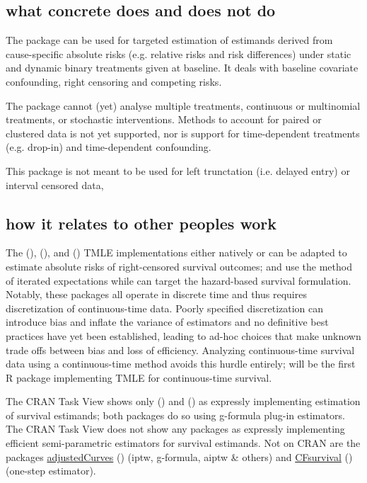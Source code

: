 \documentclass{report}
\newcommand{\1}{\ensuremath{\mathbf{1}}}
\begin{document}
\subsection{what concrete does and does not do}
\label{sec:org1a69176}
The package can be used for targeted estimation of estimands derived from cause-specific absolute risks (e.g. relative risks and risk differences) under static and dynamic binary treatments given at baseline. It deals with baseline covariate confounding, right censoring and competing risks.

The package cannot (yet) analyse multiple treatments, continuous or multinomial treatments, or stochastic interventions. Methods to account for paired or clustered data is not yet supported, nor is support for time-dependent treatments (e.g. drop-in) and time-dependent confounding.

This package is not meant to be used for left trunctation (i.e. delayed entry) or interval censored data, 

\subsection{how it relates to other peoples work}
\label{sec:org7594453}

The  (\cite{schwab_ltmle_2020}),  (\cite{sofrygin_stremr_2017}), and  (\cite{benkeser_survtmle_2019}) TMLE implementations either natively or can be adapted to estimate absolute risks of right-censored survival outcomes;  and  use the method of iterated expectations while  can target the hazard-based survival formulation. Notably, these packages all operate in discrete time and thus requires discretization of continuous-time data. Poorly specified discretization can introduce bias and inflate the variance of estimators and no definitive best practices have yet been established, leading to ad-hoc choices that make unknown trade offs between bias and loss of efficiency. Analyzing continuous-time survival data using a continuous-time method avoids this hurdle entirely;  will be the first R package implementing TMLE for continuous-time survival.

The  CRAN Task View shows only  (\cite{gerds_riskregression_2022}) and  (\cite{wallace_dtrreg_2020}) as expressly implementing estimation of survival estimands; both packages do so using g-formula plug-in estimators. The  CRAN Task View does not show any packages as expressly implementing efficient semi-parametric estimators for survival estimands. Not on CRAN are the packages \href{https://github.com/RobinDenz1/adjustedCurves}{adjustedCurves} (\cite{denz_comparison_2022}) (iptw, g-formula, aiptw \& others) and \href{https://github.com/tedwestling/CFsurvival}{CFsurvival} (\cite{westling_inference_2021}) (one-step estimator). 
\end{document}
